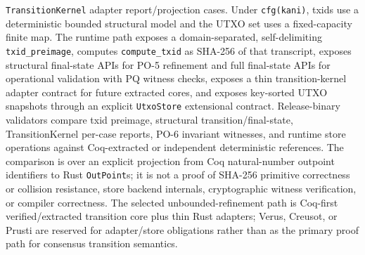 \documentclass[11pt]{article}
\begin{document}
\texttt{TransitionKernel} adapter report/projection cases. Under \texttt{cfg(kani)}, txids use a deterministic bounded structural model and the UTXO set uses a fixed-capacity finite map. The runtime path exposes a domain-separated, self-delimiting \texttt{txid\_preimage}, computes \texttt{compute\_txid} as SHA-256 of that transcript, exposes structural final-state APIs for PO-5 refinement and full final-state APIs for operational validation with PQ witness checks, exposes a thin transition-kernel adapter contract for future extracted cores, and exposes key-sorted UTXO snapshots through an explicit \texttt{UtxoStore} extensional contract. Release-binary validators compare txid preimage, structural transition/final-state, TransitionKernel per-case reports, PO-6 invariant witnesses, and runtime store operations against Coq-extracted or independent deterministic references. The comparison is over an explicit projection from Coq natural-number outpoint identifiers to Rust \texttt{OutPoint}s; it is not a proof of SHA-256 primitive correctness or collision resistance, store backend internals, cryptographic witness verification, or compiler correctness. The selected unbounded-refinement path is Coq-first verified/extracted transition core plus thin Rust adapters; Verus, Creusot, or Prusti are reserved for adapter/store obligations rather than as the primary proof path for consensus transition semantics.
\end{document}
